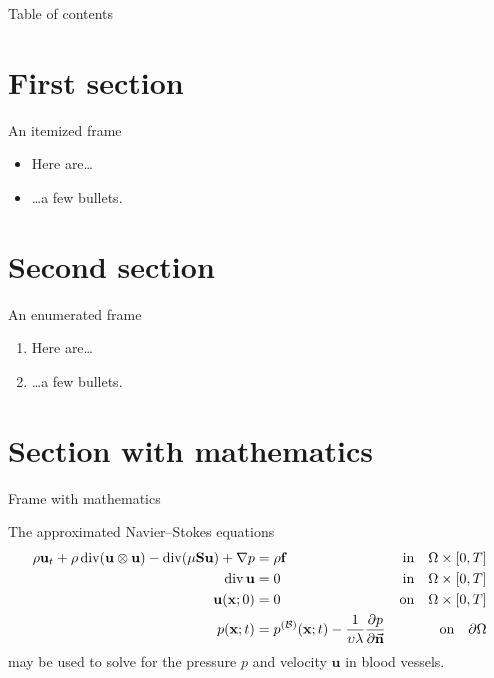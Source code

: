 %
%

\begin{frame}
\titlepage
\end{frame}

\begin{frame}{Table of contents}
\tableofcontents
\end{frame}

\section{First section}

\begin{frame}{An itemized frame}
\begin{itemize}
\item Here are\ldots
\item \ldots a few bullets.
\end{itemize}
\end{frame}

\section{Second section}

\begin{frame}{An enumerated frame}
\begin{enumerate}
\item Here are\ldots
\item \ldots a few bullets.
\end{enumerate}
\end{frame}

\section{Section with mathematics}

\begin{frame}{Frame with mathematics}

The approximated Navier--Stokes equations
\begin{align*}
        \rho\mathbf u_t + \rho\operatorname{div}(\mathbf u\otimes\mathbf u) - \operatorname{div}(\mu\mathbf{Su}) + \nabla p
        &=
        \rho\mathbf f
        &
        \text{in}\quad\Omega\times[0,T]
    \\
        \operatorname{div}\mathbf u
        &=
        0
        &
        \text{in}\quad\Omega\times[0,T]
    \\
        \mathbf u(\mathbf x; 0)
        &=
        0
        &
        \text{on}\quad\Omega\times[0,T]
    \\
        p(\mathbf x; t)
        &=
        p^{(\mathcal{B})}(\mathbf x; t)
        -
        \frac{1}{\upsilon\lambda}
        \frac{\partial p}{\partial\vec{\mathbf{n}}}
        &
        \text{on}\quad\partial\Omega
\end{align*}
may be used to solve for the pressure \(p\) and velocity \(\mathbf u\) in
blood vessels.~\cite{samavaki--etal-2023}

\end{frame}

